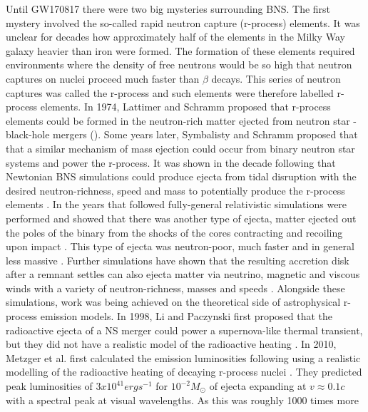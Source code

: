 Until GW170817 there were two big mysteries surrounding BNS. The first mystery involved the so-called rapid neutron capture (r-process) elements. It was unclear for decades how approximately half of the elements in the Milky Way galaxy heavier than iron were formed. The formation of these elements required environments where the density of free neutrons would be so high that neutron captures on nuclei proceed much faster than $\beta$ decays. This series of neutron captures was called the r-process and such elements were therefore labelled r-process elements. In 1974, Lattimer and Schramm proposed that r-process elements could be formed in the neutron-rich matter ejected from neutron star - black-hole mergers (\cite{lattimer1974black}). Some years later, Symbalisty and Schramm proposed that that a similar mechanism of mass ejection could occur from binary neutron star systems and power the r-process\cite{symbalisty1982neutron}. It was shown in the decade following that Newtonian BNS simulations could produce ejecta from tidal disruption with the desired neutron-richness, speed and mass to potentially produce the r-process elements \cite{davies1994merging, ruffert1996coalescing, rosswog1998mass, freiburghaus1999r}. In the years that followed fully-general relativistic simulations were performed and showed that there was another type of ejecta, matter ejected out the poles of the binary from the shocks of the cores contracting and recoiling upon impact \cite{oechslin2006torus,hotokezaka:13,sekiguchi2015dynamical,foucart2015low}. This type of ejecta was neutron-poor, much faster and in general less massive \cite{foucart2015low}. Further simulations have shown that the resulting accretion disk after a remnant settles can also ejecta matter via neutrino, magnetic and viscous winds with a variety of neutron-richness, masses and speeds \cite{fernandez2013}. Alongside these simulations, work was being achieved on the theoretical side of astrophysical r-process emission models. In 1998, Li and Paczynski first proposed that the radioactive ejecta of a NS merger could power a supernova-like thermal transient, but they did not have a realistic model of the radioactive heating \cite{li:1998bw}. In 2010, Metzger et al. first calculated the emission luminosities following using a realistic modelling of the radioactive heating of decaying r-process nuclei \cite{2010mnras.406.2650m}. They predicted peak luminosities of $3 x 10^{41} erg s^{-1}$ for $10^{-2}M_\odot$  of ejecta expanding at $v \approx 0.1 c$ with a spectral peak at visual wavelengths. As this was roughly 1000 times more
